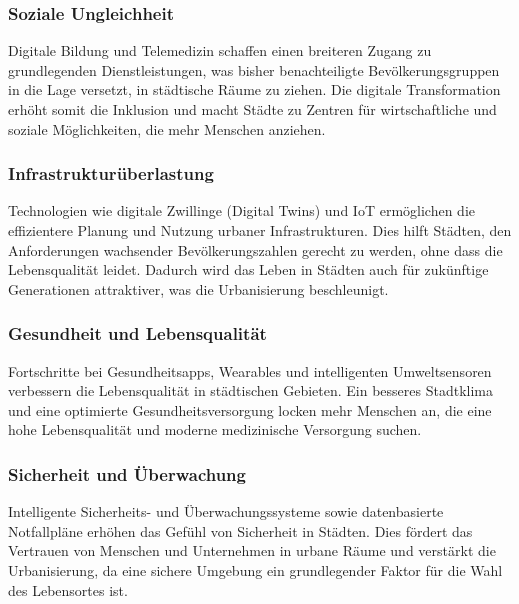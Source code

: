 \documentclass[conference,compsoc,final,a4paper, onecolumn, 11pt]{IEEEtran}
\begin{document}
\subsubsection{Soziale Ungleichheit}
Digitale Bildung und Telemedizin schaffen einen breiteren Zugang zu grundlegenden Dienstleistungen, was bisher benachteiligte Bevölkerungsgruppen in die Lage versetzt, in städtische Räume zu ziehen. 
Die digitale Transformation erhöht somit die Inklusion und macht Städte zu Zentren für wirtschaftliche und soziale Möglichkeiten, die mehr Menschen anziehen.\autocite{xpert_digital_urbanization}

\subsubsection{Infrastrukturüberlastung}
Technologien wie digitale Zwillinge (Digital Twins) und \ac{IoT} ermöglichen die effizientere Planung und Nutzung urbaner Infrastrukturen. 
Dies hilft Städten, den Anforderungen wachsender Bevölkerungszahlen gerecht zu werden, ohne dass die Lebensqualität leidet. 
Dadurch wird das Leben in Städten auch für zukünftige Generationen attraktiver, was die Urbanisierung beschleunigt.\autocite{mckinsey_smart_cities}

\subsubsection{Gesundheit und Lebensqualität}
Fortschritte bei Gesundheitsapps, Wearables und intelligenten Umweltsensoren verbessern die Lebensqualität in städtischen Gebieten. 
Ein besseres Stadtklima und eine optimierte Gesundheitsversorgung locken mehr Menschen an, die eine hohe Lebensqualität und moderne medizinische Versorgung suchen\autocite{un_habitat_world_cities}.

\subsubsection{Sicherheit und Überwachung}
Intelligente Sicherheits- und Überwachungssysteme sowie datenbasierte Notfallpläne erhöhen das Gefühl von Sicherheit in Städten. 
Dies fördert das Vertrauen von Menschen und Unternehmen in urbane Räume und verstärkt die Urbanisierung, da eine sichere Umgebung ein grundlegender Faktor für die Wahl des Lebensortes ist.\autocite{mckinsey_smart_cities}
\end{document}
